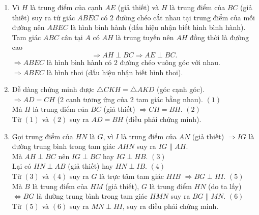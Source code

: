 \begin{bt}
{\begin{enumerate}
			$\Rightarrow HK \parallel AB$.\\
			Xét tứ giác $ABHK$ có $HK \parallel AB$ (chứng minh trên) nên $ABHK$ là hình thang (dấu hiệu nhận biết hình thang).
			\item Vì $H$ là trung điểm của cạnh $AE$ (giả thiết) và $H$ là trung điểm của $BC$ (giả thiết) suy ra tứ giác $ABEC$ có $2$ đường chéo cắt nhau tại trung điểm của mỗi đường nên $ABEC$ là hình bình hành (dấu hiệu nhận biết hình bình hành).\\
			Tam giác $ABC$ cân tại $A$ có $AH$ là trung tuyến nên $AH$ đồng thời là đường cao 
			$$\Rightarrow AH \perp BC \Rightarrow AE \perp BC.$$
			$\Rightarrow ABEC$ là hình bình hành có $2$ đường chéo vuông góc với nhau.\\
			$\Rightarrow ABEC$ là hình thoi (dấu hiệu nhận biết hình thoi).
			\item Dễ dàng chứng minh được $\triangle CKH = \triangle AKD$ (góc cạnh góc).\\
			$\Rightarrow AD=CH$ ($2$ cạnh tương ứng của $2$ tam giác bằng nhau).  \hfill$(1)$\\
			Mà $H$ là trung điểm của $BC$ (giả thiết) $\Rightarrow CH=BH$.  \hfill$(2)$\\
			Từ $(1)$ và $(2)$ suy ra $AD=BH$ (điều phải chứng minh).
			\item Gọi trung điểm của $HN$ là $G$, vì $I$ là trung điểm của $AN$ (giả thiết) $\Rightarrow IG$ là đường trung bình trong tam giác $AHN$ suy ra $IG \parallel AH$.\\
			Mà $AH \perp BC$ nên $IG \perp BC$ hay $IG \perp HB$.  \hfill$(3)$\\
			Lại có $HN \perp AB$ (giả thiết) hay $HN \perp IB$.  \hfill$(4)$\\
			Từ $(3)$ và $(4)$ suy ra $G$ là trực tâm tam giác $HIB$ $\Rightarrow BG \perp HI$.  \hfill$(5)$\\
			Mà $B$ là trung điểm của $HM$ (giả thiết), $G$ là trung điểm $HN$ (do ta lấy) $\Leftrightarrow BG$ là đường trung bình trong tam giác $HMN$ suy ra $BG \parallel MN$.  \hfill$(6)$\\
			Từ $(5)$ và $(6)$ suy ra $MN \perp HI$, suy ra điều phải chứng minh.
		\end{enumerate}
	}
\end{bt}
